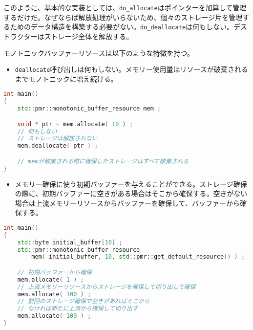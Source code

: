 このように、基本的な実装としては、\lstinline!do_allocate!はポインターを加算して管理するだけだ。なぜならば解放処理がいらないため、個々のストレージ片を管理するためのデータ構造を構築する必要がない。\lstinline!do_deallocate!は何もしない。デストラクターはストレージ全体を解放する。

%

モノトニックバッファーリソースは以下のような特徴を持つ。

\begin{itemize}[leftmargin=*]
\item
  \lstinline!deallocate!呼び出しは何もしない。メモリー使用量はリソースが破棄されるまでモノトニックに増え続ける。
\end{itemize}

\begin{lstlisting}[language=C++]
int main()
{
    std::pmr::monotonic_buffer_resource mem ;

    void * ptr = mem.allocate( 10 ) ;
    // 何もしない
    // ストレージは解放されない
    mem.deallocate( ptr ) ;

    // memが破棄される際に確保したストレージはすべて破棄される
}
\end{lstlisting}

\begin{itemize}[leftmargin=*]
\item
  メモリー確保に使う初期バッファーを与えることができる。ストレージ確保の際に、初期バッファーに空きがある場合はそこから確保する。空きがない場合は上流メモリーリソースからバッファーを確保して、バッファーから確保する。
\end{itemize}

\begin{lstlisting}[language=C++]
int main()
{
    std::byte initial_buffer[10] ;
    std::pmr::monotonic_buffer_resource 
        mem( initial_buffer, 10, std::pmr::get_default_resource() ) ;

    // 初期バッファーから確保
    mem.allocate( 1 ) ;
    // 上流メモリーリソースからストレージを確保して切り出して確保
    mem.allocate( 100 ) ;
    // 前回のストレージ確保で空きがあればそこから
    // なければ新たに上流から確保して切り出す
    mem.allocate( 100 ) ;
}
\end{lstlisting}

